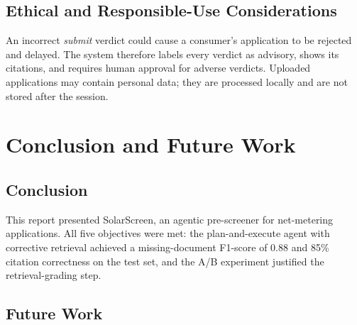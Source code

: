 \documentclass[12pt,a4paper,oneside]{report}
\newif\ifguidance
\newcommand{\guide}[1]{%
  \ifguidance
  \begin{tcolorbox}[enhanced,breakable,colback=guidebg,colframe=bmsblue,
    boxrule=0.6pt,arc=2pt,left=6pt,right=6pt,top=4pt,bottom=4pt,
    fonttitle=\bfseries\small,title={What to write here},
    before upper={\small\setstretch{1.1}}]
  #1
  \end{tcolorbox}
  \fi}
\newcommand{\dodont}[2]{%
  \ifguidance
  \begin{tcolorbox}[enhanced,breakable,sidebyside,sidebyside align=top seam,
    colback=dobg,colbacklower=dontbg,colframe=gray!60,boxrule=0.5pt,arc=2pt,
    lefthand ratio=0.5,left=5pt,right=5pt,top=4pt,bottom=4pt,
    fontupper=\small\setstretch{1.05},fontlower=\small\setstretch{1.05}]
  \textbf{\textcolor{ForestGreen}{\checkmark\ Do}}
  \begin{itemize}[leftmargin=12pt,itemsep=1pt,topsep=2pt]#1\end{itemize}
  \tcblower
  \textbf{\textcolor{BrickRed}{$\times$ Don't}}
  \begin{itemize}[leftmargin=12pt,itemsep=1pt,topsep=2pt]#2\end{itemize}
  \end{tcolorbox}
  \fi}
\newcommand{\pagebudget}[1]{%
  \ifguidance\noindent{\small\textcolor{bmsblue}{\textbf{Expected length:} #1 pages}}\par\medskip\fi}
\newenvironment{sample}
  {\par\noindent{\footnotesize\bfseries\textcolor{BrickRed}{[SAMPLE --- replace with your own content]}}\par\color{samplecol}}
  {\par\medskip}
\begin{document}
\section{Ethical and Responsible-Use Considerations}
\guide{Discuss who could be harmed by a wrong output, privacy of user data, bias, and why the system
remains advisory and human-confirmed (Section~8.3 of the guidelines).}
\dodont{\item State clearly that the output is advisory.}
{\item Do not present the agent's output as a legal, medical or financial decision.}
\begin{sample}
An incorrect \emph{submit} verdict could cause a consumer's application to be rejected and delayed.
The system therefore labels every verdict as advisory, shows its citations, and requires human
approval for adverse verdicts. Uploaded applications may contain personal data; they are processed
locally and are not stored after the session.
\end{sample}


\chapter{Conclusion and Future Work}
\pagebudget{1--2}
\section{Conclusion}
\guide{Restate the problem, what was built, and the main quantitative results. Revisit each objective
from Section~1.4 and state whether it was met.}
\dodont{\item Answer each objective explicitly.}
{\item Do not introduce new results here.
\item Do not overstate the impact.}
\begin{sample}
This report presented SolarScreen, an agentic pre-screener for net-metering applications. All five
objectives were met: the plan-and-execute agent with corrective retrieval achieved a missing-document
F1-score of 0.88 and 85\% citation correctness on the test set, and the A/B experiment justified the
retrieval-grading step.
\end{sample}

\section{Future Work}
\guide{Three to five concrete, feasible extensions that follow from your limitations.}
\dodont{\item Link each item to a stated limitation.
}
{\item Do not list vague ideas such as ``use better AI''.
}
\end{document}
